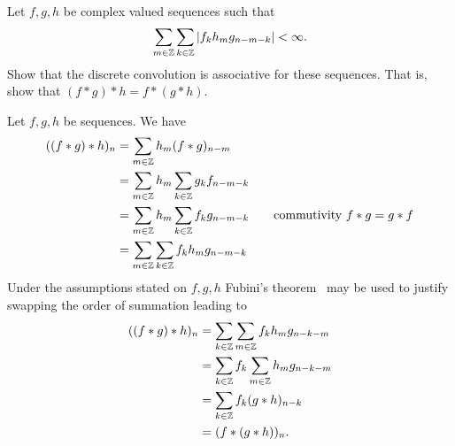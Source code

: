 \begin{excersizelist}
\begin{hardexercise}
\item \label{excer:discrconvassociative} Let $f,g,h$ be complex valued sequences such that 
\[
\sum_{m \in {\mathbb Z}} \sum_{k \in {\mathbb Z}} \left\vert f_{k} h_m g_{n-m-k} \right\vert < \infty.
\]
Show that the discrete convolution is associative for these sequences.  That is, show that $(f*g)*h = f*(g*h)$.
\begin{solution}
Let $f,g,h$ be sequences.  We have
\begin{align*}
((f*g)*h)_n &= \sum_{m \in {\mathbb Z}} h_{m} (f*g)_{n-m} \\
&= \sum_{m \in {\mathbb Z}} h_{m} \sum_{k \in {\mathbb Z}} g_{k} f_{n-m-k} \\
&= \sum_{m \in {\mathbb Z}} h_{m} \sum_{k \in {\mathbb Z}} f_{k} g_{n-m-k} \qquad \text{commutivity $f*g=g*f$} \\
&= \sum_{m \in {\mathbb Z}} \sum_{k \in {\mathbb Z}} f_{k} h_m g_{n-m-k} \\
\end{align*}
Under the assumptions stated on $f,g,h$ Fubini's theorem~\cite[Theorem~8.8]{Rudin_real_and_complex_analysis} may be used to justify swapping the order of summation leading to
\begin{align*}
((f*g)*h)_n &= \sum_{k \in {\mathbb Z}} \sum_{m \in {\mathbb Z}}  f_{k} h_m g_{n-k-m} \\
&= \sum_{k \in {\mathbb Z}} f_{k} \sum_{m \in {\mathbb Z}}  h_m g_{n-k-m} \\
&= \sum_{k \in {\mathbb Z}} f_{k} (g*h)_{n-k} \\
&= (f*(g*h))_n.
\end{align*}
\end{solution}

\end{hardexercise}

\end{excersizelist}




